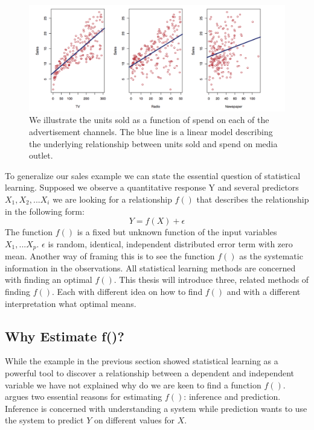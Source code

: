 \documentclass{article}
\begin{document}
        \begin{figure}
            \centering
            \includegraphics[width=\textwidth]{sales}
            \caption{We illustrate the units sold as a function of spend on each of the advertisement channels. The blue line is a linear model describing the underlying relationship between units sold and spend on media outlet.}
            \label{fig:sales}
        \end{figure}
        
    To generalize our sales example we can state the essential question of statistical learning. Supposed we observe a quantitative response Y and several predictors $X_1, X_2 , ... X_i$ we are looking for a relationship $f()$ that describes the relationship in the following form:
    \begin{equation}
        Y = f(X) + \epsilon
    \end{equation}
    The function $f()$ is a fixed but unknown function of the input variables $X_1, ... X_p$. $\epsilon$ is random, identical, independent distributed error term with zero mean. Another way of framing this is to see the function $f()$ as the systematic information in the observations. All statistical learning methods are concerned with finding an optimal $f()$. This thesis will introduce three, related methods of finding $f()$. Each with different idea on how to find $f()$ and with a different interpretation what optimal means.


    \subsection{Why Estimate f()?}
    While the example in the previous section showed statistical learning as a powerful tool to discover a relationship between a dependent and independent variable we have not explained why do we are keen to find a function $f()$. \cite{hastie} argues two essential reasons for estimating $f()$: inference and prediction. Inference is concerned with understanding a system while prediction wants to use the system to predict $Y$ on different values for $X$.
    
\end{document}

